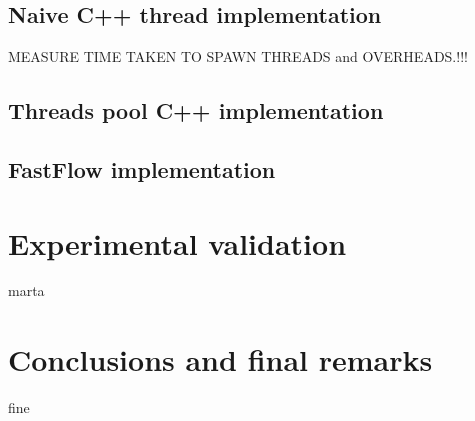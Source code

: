 \documentclass[11pt]{article}
\begin{document}
\subsection{Naive C++ thread implementation}
MEASURE TIME TAKEN TO SPAWN THREADS and OVERHEADS.!!!
\subsection{Threads pool C++ implementation}
\subsection{FastFlow implementation}

\section{Experimental validation}
marta
\section{Conclusions and final remarks}
fine
\end{document}
